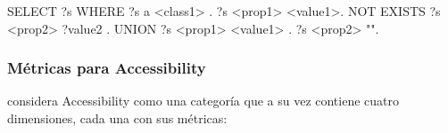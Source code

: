 \begin{listing}[
  float=ht,
  language = SQL,
  numbers=left,
  numberstyle=\tiny,
  stepnumber=1,
  numbersep=5pt,
  frame=single,
  caption  = {Consulta \acs{SPARQL} para identificación de literales perdidos (y
  II)},
  label    = code:query2]
SELECT ?s 
WHERE { {
      ?s a <class1> .
      ?s <prop1> <value1>.
   NOT EXISTS{
      ?s <prop2> ?value2 .
   }
   }UNION{
      ?s <prop1> <value1> .
      ?s <prop2> "".
   }}
\end{listing}



\subsubsection{Métricas para Accessibility}

\cite{zaveri_quality_2013} considera Accessibility como una
categoría que a su vez contiene cuatro dimensiones, cada una con sus métricas: 

